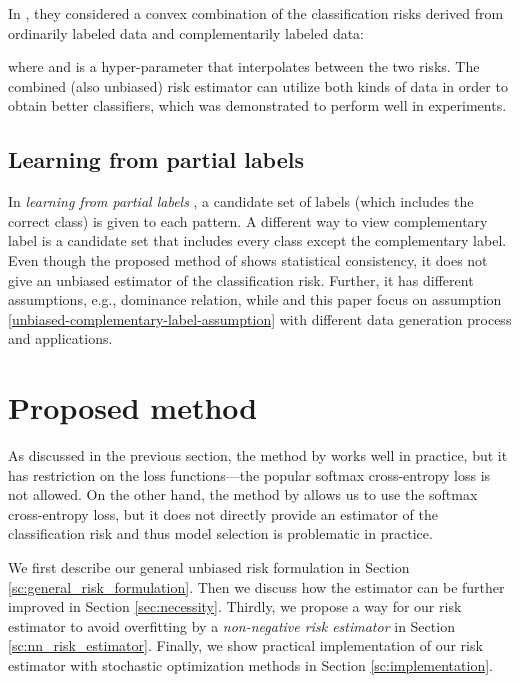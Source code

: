 \documentclass{article}
\begin{document}
In \citet{ishida17nips}, they considered a convex combination of the classification risks derived from ordinarily labeled data and complementarily labeled data:

where  and  is a hyper-parameter that interpolates between the two risks.
The combined (also unbiased) risk estimator can utilize both kinds of data in order to obtain better classifiers, which was demonstrated to perform well in experiments.

\subsection{Learning from partial labels}
In \emph{learning from partial labels} \citep{partial}, a candidate set of labels (which includes the correct class) is given to each pattern.  A different way to view complementary label is a candidate set that includes every class except the complementary label.  Even though the proposed method of \citet{partial} shows statistical consistency, it does not give an unbiased estimator of the classification risk.  Further, it has different assumptions, e.g., dominance relation, while \citet{ishida17nips} and this paper focus on  assumption \eqref{unbiased-complementary-label-assumption} with different data generation process and applications.

\section{Proposed method}\label{sc:proposed_method}
As discussed in the previous section, the method by \citet{ishida17nips} works well in practice, but it has restriction on the loss functions---the popular softmax cross-entropy loss is not allowed.
On the other hand, the method by \citet{yu17eccv} allows us to use the softmax cross-entropy loss, but it does not directly provide an estimator of the classification risk and thus model selection is problematic in practice.

We first describe our general unbiased risk formulation in Section \ref{sc:general_risk_formulation}.
Then we discuss how the estimator can be further improved in Section \ref{sec:necessity}.
Thirdly, we propose a way for our risk estimator to avoid overfitting by a \emph{non-negative risk estimator} in Section \ref{sc:nn_risk_estimator}.
Finally, we show practical implementation of our risk estimator with stochastic optimization methods in Section \ref{sc:implementation}.
\end{document}
